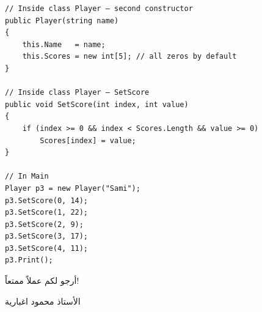 \documentclass[14pt]{extarticle}
\begin{document}
\begin{enumerate}
\ifwithsols
\begin{boxSolution}
\begin{english}
{\small
\begin{verbatim}
// Inside class Player — second constructor
public Player(string name)
{
    this.Name   = name;
    this.Scores = new int[5]; // all zeros by default
}

// Inside class Player — SetScore
public void SetScore(int index, int value)
{
    if (index >= 0 && index < Scores.Length && value >= 0)
        Scores[index] = value;
}

// In Main
Player p3 = new Player("Sami");
p3.SetScore(0, 14);
p3.SetScore(1, 22);
p3.SetScore(2, 9);
p3.SetScore(3, 17);
p3.SetScore(4, 11);
p3.Print();
\end{verbatim}
}
\end{english}
\end{boxSolution}
\fi

\end{enumerate}

\vspace{1em}
\begin{flushleft}
أرجو لكم عملاً ممتعاً!

الأستاذ محمود اغبارية
\end{flushleft}
\end{document}
